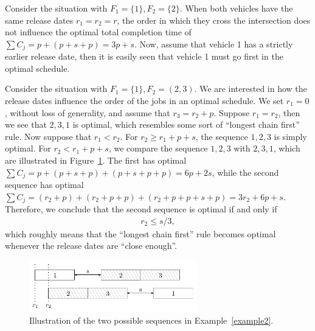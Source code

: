 \documentclass{article}
\theoremstyle{definition}
\theoremstyle{plain}
\begin{document}
\begin{eg}
  Consider the situation with $F_{1} = \{ 1 \}, F_{2} = \{ 2 \}$. When both
  vehicles have the same release dates $r_{1} = r_{2} = r$, the order in which
  they cross the intersection does not influence the optimal total completion
  time of $\sum C_{j} = p + (p + s + p) = 3p + s$. Now, assume that vehicle 1
  has a strictly earlier release date, then it is easily seen that vehicle 1
  must go first in the optimal schedule.
\end{eg}
%
\begin{eg}
  \label{example2}
  Consider the situation with $F_{1} = \{ 1 \}, F_{2} = ( 2, 3 )$. We are
  interested in how the release dates influence the order of the jobs in an
  optimal schedule. We set $r_{1} = 0$, without loss of generality, and assume
  that $r_{3} = r_{2} + p$. Suppose $r_{1} = r_{2}$, then we see that $2, 3, 1$
  is optimal, which resembles some sort of ``longest chain first'' rule. Now
  suppose that $r_{1} < r_{2}$. For $r_{2} \geq r_{1} + p + s$, the sequence
  $1, 2, 3$ is simply optimal. For $r_{2} < r_{1} + p + s$, we compare the
  sequence $1, 2, 3$ with $2, 3, 1$, which are illustrated in
  Figure~\ref{fig:example2}. The first has optimal
  $\sum C_{j} = p + (p+s+p) + (p+s+p+p) = 6p + 2s$, while the second sequence
  has optimal
  $\sum C_{j} = (r_{2} + p) + (r_{2} + p + p) + (r_{2} + p + p + s + p) = 3 r_{2} + 6p + s$.
  Therefore, we conclude that the second sequence is optimal if and only if
  \begin{align}
    r_{2} \leq s/3 ,
    \label{eq:before-condition}
  \end{align}
  which roughly means that the ``longest chain first'' rule becomes optimal
  whenever the release dates are ``close enough''.
\end{eg}
%
\begin{figure}[t]
  \centering
  \includegraphics[width=0.65\textwidth]{figures/123.pdf}
  \caption{Illustration of the two possible sequences in Example~\ref{example2}.}
  \label{fig:example2}
\end{figure}
\end{document}
